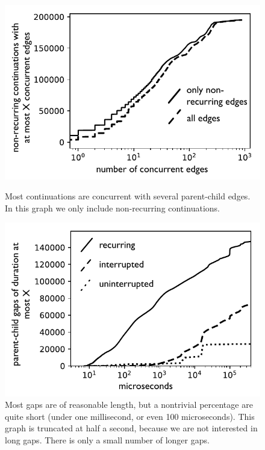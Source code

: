 \documentclass[acmsmall,anonymous,review]{acmart}\settopmatter{printfolios=true,printccs=false,printacmref=false}
\begin{document}
\begin{figure}
    \centering
    \begin{minipage}[t]{0.47\textwidth}
        \centering
        \includegraphics[width=1.0\textwidth]{Graphs/concurrency_bw}
        \caption{Most continuations are concurrent with several parent-child edges.
        In this graph we only include non-recurring continuations.}
        \label{fig:graph_concurrency}
    \end{minipage}\hfill
    \begin{minipage}[t]{0.47\textwidth}
        \centering
        \includegraphics[width=1.0\textwidth]{Graphs/gaps_bw}
        \caption{Most gaps are of reasonable length, but a nontrivial percentage are quite short (under one millisecond, or even 100 microseconds).
  This graph is truncated at half a second, because we are not interested in long gaps.
  There is only a small number of longer gaps.}
        \label{fig:graph_gaps}
    \end{minipage}
\end{figure}
\end{document}
